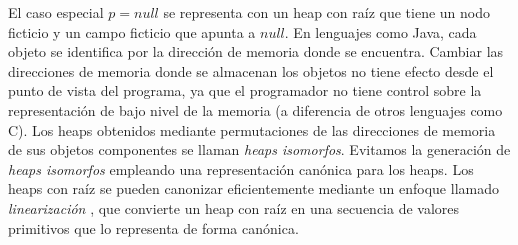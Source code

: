 El caso especial $p = null$ se representa con un heap con raíz que tiene un nodo
ficticio y un campo ficticio que apunta a $null$. En lenguajes como Java, cada
objeto se identifica por la dirección de memoria donde se encuentra. Cambiar las
direcciones de memoria donde se almacenan los objetos no tiene efecto desde el
punto de vista del programa, ya que el programador no tiene control sobre la
representación de bajo nivel de la memoria (a diferencia de otros lenguajes como
C). Los heaps obtenidos mediante permutaciones de las direcciones de memoria de
sus objetos componentes se llaman \emph{heaps
isomorfos}\cite{Iosif02,Boyapati02}. Evitamos la generación de \emph{heaps
isomorfos} empleando una representación canónica para los heaps. Los heaps con
raíz se pueden canonizar eficientemente mediante un enfoque llamado
\emph{linearización} \cite{Iosif02,Xie04}, que convierte un heap con raíz en
una secuencia de valores primitivos que lo representa de forma canónica.

\bigbreak




